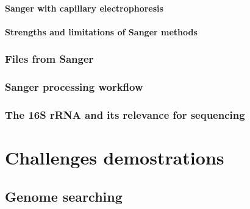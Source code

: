 \documentclass[
  letterpaper,
  DIV=11,
  numbers=noendperiod]{scrreprt}
\begin{document}
\hypertarget{sanger-with-capillary-electrophoresis}{%
\subsection*{Sanger with capillary
electrophoresis}\label{sanger-with-capillary-electrophoresis}}

\hypertarget{strengths-and-limitations-of-sanger-methods}{%
\subsection*{Strengths and limitations of Sanger
methods}\label{strengths-and-limitations-of-sanger-methods}}

\hypertarget{files-from-sanger}{%
\section*{Files from Sanger}\label{files-from-sanger}}

\hypertarget{sanger-processing-workflow}{%
\section*{Sanger processing workflow}\label{sanger-processing-workflow}}

\hypertarget{the-16s-rrna-and-its-relevance-for-sequencing}{%
\section*{The 16S rRNA and its relevance for
sequencing}\label{the-16s-rrna-and-its-relevance-for-sequencing}}

\part{Challenges demostrations}

\hypertarget{genome-searching}{%
\chapter{Genome searching}\label{genome-searching}}
\end{document}
